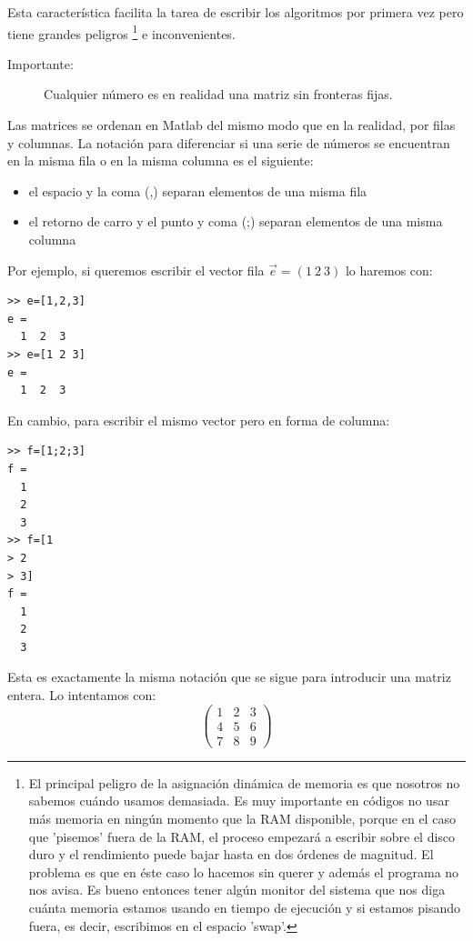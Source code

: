 Esta característica facilita la tarea de escribir los algoritmos por
primera vez pero tiene grandes peligros \footnote{El principal peligro
  de la asignación dinámica de memoria es que nosotros no sabemos
  cuándo usamos demasiada. Es muy importante en códigos no usar más
  memoria en ningún momento que la RAM disponible, porque en el caso
  que 'pisemos' fuera de la RAM, el proceso empezará a escribir sobre
  el disco duro y el rendimiento puede bajar hasta en dos órdenes de
  magnitud. El problema es que en éste caso lo hacemos sin querer y
  además el programa no nos avisa.  Es bueno entonces tener algún
  monitor del sistema que nos diga cuánta memoria estamos usando en
  tiempo de ejecución y si estamos pisando fuera, es decir, escribimos
  en el espacio 'swap'. %
} e inconvenientes.

\begin{description}
\item [Importante:]Cualquier número es en realidad una matriz sin
  fronteras fijas.
\end{description}
Las matrices se ordenan en Matlab del mismo modo que en la realidad,
por filas y columnas. La notación para diferenciar si una serie de
números se encuentran en la misma fila o en la misma columna es el
siguiente:

\begin{itemize}
\item el espacio y la coma (,) separan elementos de una misma fila
\item el retorno de carro y el punto y coma (;) separan elementos de
  una misma columna
\end{itemize}
Por ejemplo, si queremos escribir el vector fila $\vec{e}=(1\ 2\ 3)$
lo haremos con:

\begin{verbatim}
>> e=[1,2,3]
e =
  1  2  3
>> e=[1 2 3]
e =
  1  2  3
\end{verbatim}
En cambio, para escribir el mismo vector pero en forma de columna:

\begin{verbatim}
>> f=[1;2;3]
f =
  1
  2
  3
>> f=[1
> 2
> 3]
f =
  1
  2
  3
\end{verbatim}
Esta es exactamente la misma notación que se sigue para introducir una
matriz entera. Lo intentamos con:
$$ \left(
  \begin{array}{ccc}
    1 & 2 & 3\\
    4 & 5 & 6\\
    7 & 8 & 9
  \end{array}\right)$$

